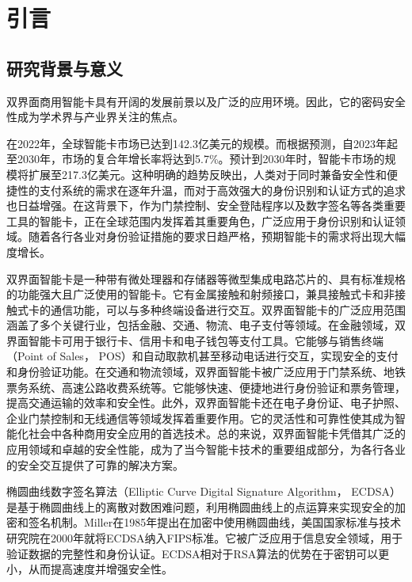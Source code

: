 \chapter{引言}\label{chap:introduction}{
	\section{研究背景与意义}
	双界面商用智能卡具有开阔的发展前景以及广泛的应用环境。因此，它的密码安全性成为学术界与产业界关注的焦点。
	
	在2022年，全球智能卡市场已达到142.3亿美元的规模。而根据预测，自2023年起至2030年，市场的复合年增长率将达到5.7\%\citep{GVR-1-68038-464-2}。预计到2030年时，智能卡市场的规模将扩展至217.3亿美元。这种明确的趋势反映出，人类对于同时兼备安全性和便捷性的支付系统的需求在逐年升温，而对于高效强大的身份识别和认证方式的追求也日益增强。在这背景下，作为门禁控制、安全登陆程序以及数字签名等各类重要工具的智能卡，正在全球范围内发挥着其重要角色，广泛应用于身份识别和认证领域。随着各行各业对身份验证措施的要求日趋严格，预期智能卡的需求将出现大幅度增长。
	
	双界面智能卡是一种带有微处理器和存储器等微型集成电路芯片的、具有标准规格的功能强大且广泛使用的智能卡。它有金属接触和射频接口，兼具接触式卡和非接触式卡的通信功能，可以与多种终端设备进行交互。双界面智能卡的广泛应用范围涵盖了多个关键行业，包括金融、交通、物流、电子支付等领域。在金融领域，双界面智能卡可用于银行卡、信用卡和电子钱包等支付工具。它能够与销售终端（Point of Sales， POS）和自动取款机甚至移动电话进行交互，实现安全的支付和身份验证功能。在交通和物流领域，双界面智能卡被广泛应用于门禁系统、地铁票务系统、高速公路收费系统等。它能够快速、便捷地进行身份验证和票务管理，提高交通运输的效率和安全性。此外，双界面智能卡还在电子身份证、电子护照、企业门禁控制和无线通信等领域发挥着重要作用。它的灵活性和可靠性使其成为智能化社会中各种商用安全应用的首选技术。总的来说，双界面智能卡凭借其广泛的应用领域和卓越的安全性能，成为了当今智能卡技术的重要组成部分，为各行各业的安全交互提供了可靠的解决方案。
	
	椭圆曲线数字签名算法（Elliptic Curve Digital Signature Algorithm， ECDSA）是基于椭圆曲线上的离散对数困难问题，利用椭圆曲线上的点运算来实现安全的加密和签名机制。Miller\citep{Miller85}在1985年提出在加密中使用椭圆曲线，美国国家标准与技术研究院在2000年就将ECDSA纳入FIPS标准\citep{FIPS186-2}。它被广泛应用于信息安全领域，用于验证数据的完整性和身份认证。ECDSA相对于RSA算法的优势在于密钥可以更小，从而提高速度并增强安全性。
	
}
